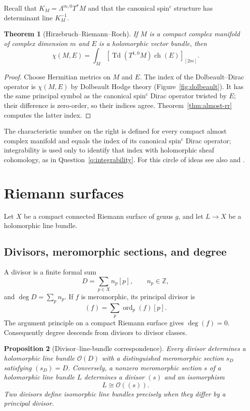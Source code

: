 \documentclass[11pt,oneside,reqno]{book}
\theoremstyle{plain}
\newtheorem{theorem}{Theorem}[chapter]
\newtheorem{proposition}[theorem]{Proposition}
\theoremstyle{definition}
\theoremstyle{remark}
\begin{document}
Recall that \(K_M=\Lambda^{m,0}T^*M\) and that the canonical
spin\(^{c}\) structure has determinant line \(K_M^{-1}\).

\begin{theorem}[Hirzebruch--Riemann--Roch]\label{thm:hrr}
If \(M\) is a compact complex manifold of complex dimension \(m\) and
\(E\) is a holomorphic vector bundle, then
\[
 \boxed{
 \chi(M,E)
 =
 \int_M
 \left[
 \operatorname{Td}(T^{1,0}M)
 \operatorname{ch}(E)
 \right]_{[2m]}.
 }
\]
\end{theorem}

\begin{proof}
Choose Hermitian metrics on \(M\) and \(E\).  The index of the
Dolbeault--Dirac operator is \(\chi(M,E)\) by Dolbeault Hodge theory
(Figure~\ref{fig:dolbeault}).  It has the same principal symbol as the
canonical spin\(^{c}\) Dirac operator twisted by \(E\); their difference is
zero-order, so their indices agree.  Theorem~\ref{thm:almost-rr} computes
the latter index.
\end{proof}

The characteristic number on the right is defined for every compact almost
complex manifold and equals the index of its canonical spin\(^{c}\) Dirac
operator; integrability is used only to identify that index with
holomorphic sheaf cohomology, as in Question~\ref{q:integrability}.  For
this circle of ideas see also \cite{LM} and
\cite{Wells}.

\section{Riemann surfaces}

Let \(X\) be a compact connected Riemann surface of genus \(g\), and let
\(L\to X\) be a holomorphic line bundle.

\subsection{Divisors, meromorphic sections, and degree}

A divisor is a finite formal sum
\[
 D=\sum_{p\in X}n_p[p],\qquad n_p\in\mathbb Z,
\]
and \(\deg D=\sum_pn_p\).  If \(f\) is meromorphic, its principal divisor is
\[
 (f)=\sum_p\operatorname{ord}_p(f)[p].
\]
The argument principle on a compact Riemann surface gives
\(\deg(f)=0\).  Consequently degree descends from divisors to divisor
classes.

\begin{proposition}[Divisor--line-bundle correspondence]
Every divisor determines a holomorphic line bundle \(\mathcal O(D)\) with a
distinguished meromorphic section \(s_D\) satisfying \((s_D)=D\).
Conversely, a nonzero meromorphic section \(s\) of a holomorphic line
bundle \(L\) determines a divisor \((s)\) and an isomorphism
\[
 L\cong\mathcal O((s)).
\]
Two divisors define isomorphic line bundles precisely when they differ by
a principal divisor.
\end{proposition}
\end{document}

